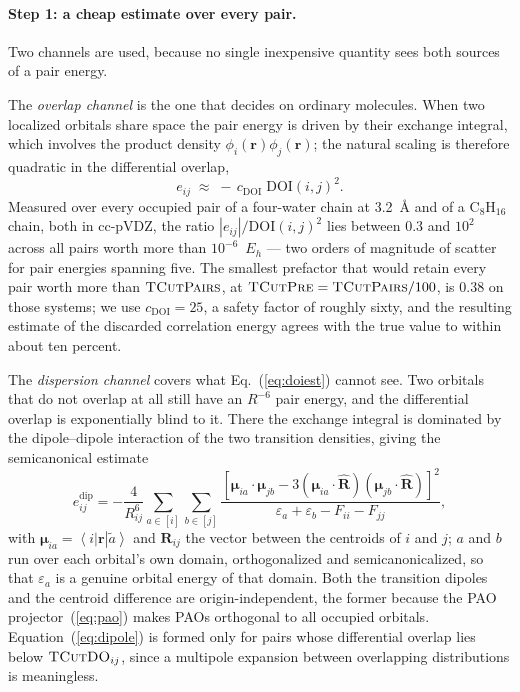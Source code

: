 \documentclass[aip,jcp,amsmath,amssymb,preprint,superscriptaddress]{revtex4-2}%
\newcommand{\ket}[1]{\left|#1\right\rangle}
\newcommand{\bra}[1]{\left\langle#1\right|}
\newcommand{\pao}[1]{\tilde{#1}}
\newcommand{\TCut}[1]{\textsc{TCut#1}}
\begin{document}
\paragraph{Step 1: a cheap estimate over every pair.}
Two channels are used, because no single inexpensive quantity sees both
sources of a pair energy.

The \emph{overlap channel} is the one that decides on ordinary molecules. When
two localized orbitals share space the pair energy is driven by their exchange
integral, which involves the product density $\phi_i(\mathbf{r})
\phi_j(\mathbf{r})$; the natural scaling is therefore quadratic in the
differential overlap,
%
\begin{equation}
  e_{ij} \;\approx\; -\,c_{\text{DOI}}\;\mathrm{DOI}(i,j)^2 .
  \label{eq:doiest}
\end{equation}
%
Measured over every occupied pair of a four-water chain at 3.2~\AA{} and of a
C$_8$H$_{16}$ chain, both in cc-pVDZ, the ratio
$|e_{ij}|/\mathrm{DOI}(i,j)^2$ lies between $0.3$ and $10^{2}$ across all
pairs worth more than $10^{-6}$~$E_h$ --- two orders of magnitude of scatter
for pair energies spanning five. The smallest prefactor that would retain
every pair worth more than $\TCut{Pairs}$, at $\TCut{Pre}=\TCut{Pairs}/100$,
is $0.38$ on those systems; we use $c_{\text{DOI}}=25$, a safety factor of
roughly sixty, and the resulting estimate of the discarded correlation energy
agrees with the true value to within about ten percent.

The \emph{dispersion channel} covers what Eq.~(\ref{eq:doiest}) cannot see.
Two orbitals that do not overlap at all still have an $R^{-6}$ pair energy,
and the differential overlap is exponentially blind to it. There the exchange
integral is dominated by the dipole--dipole interaction of the two transition
densities, giving the semicanonical estimate
%
\begin{equation}
  e^{\text{dip}}_{ij} = -\frac{4}{R_{ij}^{6}}
    \sum_{a\in[i]}\sum_{b\in[j]}
    \frac{\left[\bm{\mu}_{ia}\!\cdot\!\bm{\mu}_{jb}
      - 3(\bm{\mu}_{ia}\!\cdot\!\hat{\mathbf{R}})
         (\bm{\mu}_{jb}\!\cdot\!\hat{\mathbf{R}})\right]^{2}}
    {\varepsilon_a+\varepsilon_b-F_{ii}-F_{jj}},
  \label{eq:dipole}
\end{equation}
%
with $\bm{\mu}_{ia}=\bra{i}\mathbf{r}\ket{\pao{a}}$ and $\mathbf{R}_{ij}$ the
vector between the centroids of $i$ and $j$; $a$ and $b$ run over each
orbital's own domain, orthogonalized and semicanonicalized, so that
$\varepsilon_a$ is a genuine orbital energy of that domain. Both the
transition dipoles and the centroid difference are origin-independent, the
former because the PAO projector~(\ref{eq:pao}) makes PAOs orthogonal to all
occupied orbitals. Equation~(\ref{eq:dipole}) is formed only for pairs whose
differential overlap lies below $\TCut{DO}_{ij}$, since a multipole expansion
between overlapping distributions is meaningless.
\end{document}
